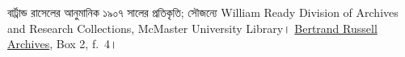 বার্ট্রান্ড রাসেলের আনুমানিক ১৯০৭ সালের প্রতিকৃতি; সৌজন্যে
William Ready Division of Archives and Research Collections, McMaster University
Library। \href{http://www.mcmaster.ca/russdocs/russell.htm}{Bertrand
Russell Archives}, Box 2, f.~4।
